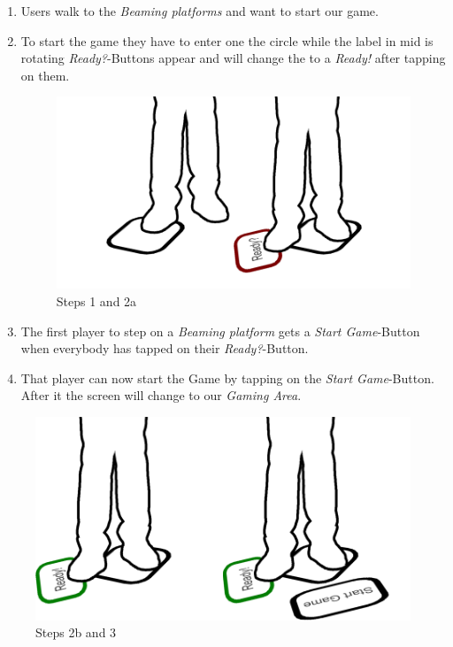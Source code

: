 \documentclass{sigchi}
\begin{document}
\begin{enumerate}
\item Users walk to the \textit{Beaming platforms} and want to start our game.
\item To start the game they have to enter one the circle while the label in mid is rotating \textit{Ready?}-Buttons appear and will change the to a \textit{Ready!} after tapping on them.
\begin{figure}[H]
\centering
\includegraphics[width=0.9\columnwidth]{walkthrough/klein/beamingarea1+2a}
\caption{Steps 1 and 2a}
\label{fig:gamingArea}
\end{figure}

\item The first player to step on a \textit{Beaming platform} gets a \textit{Start Game}-Button when everybody has tapped on their \textit{Ready?}-Button.
\item That player can now start the Game by tapping on the \textit{Start Game}-Button. After it the screen will change to our \textit{Gaming Area}.
\end{enumerate}

\begin{figure}[H]
\centering
\includegraphics[width=0.9\columnwidth]{walkthrough/klein/beamingarea2b+3}
\caption{Steps 2b and 3}
\label{fig:gamingArea}
\end{figure}
\end{document}

